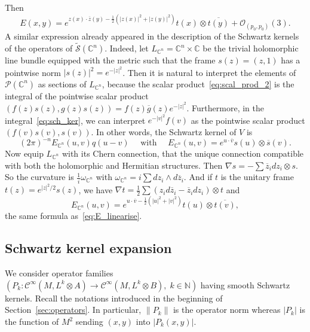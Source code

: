 \documentclass[10pt,a4paper]{article}
\theoremstyle{definition}
\numberwithin{equation}{section}
\newcommand{\N}{{\mathbb{N}}}
\newcommand{\C}{{\mathbb{C}}}
\newcommand{\om}{{\omega}}
\newcommand{\con}{\overline}
\newcommand{\Ci}{{\mathcal{C}}^{\infty}}
\newcommand{\bigo}{\mathcal{O}}
\newcommand{\symb}{\mathcal{S}}
\newcommand{\pol}{\mathcal{P}}
\begin{document}
Then
\begin{equation}\label{eq:E_linearise}
E(x,y) = e^{ z(x) \cdot \con{z} (y) -\frac{1}{2} \left(|z(x)|^2 + |z (y)|^2\right)} t(x) \otimes \con{t(y)} + \bigo_{\left(p_0, p_0\right)} (3).
\end{equation}
A similar expression already appeared in the description of the Schwartz kernels of the operators of $\widetilde{\symb} (\C^n)$. Indeed, let $L_{\C^n}= \C^n \times \C$ be the trivial holomorphic line bundle equipped with the metric such that the frame $s(z) = (z,1)$ has a pointwise norm $|s(z)|^2 = e^{-|z|^2}$. Then it is natural to interpret the elements of $\pol (\C^n)$ as sections of $L_{\C^n}$, because the scalar product~\eqref{eq:scal_prod_2} is the integral of the pointwise scalar product $(f (z) s(z), g(z) s(z)) = f(z) \con{g} (z) e^{-|z|^2}$. Furthermore, in the integral~\eqref{eq:sch_ker}, we can interpret $e^{-|v|^2} f(v)$ as the pointwise scalar product $(f(v) s(v), s(v))$. In other words, the Schwartz kernel of $V$ is
\begin{equation}\label{eq:2pin-e_cn-u}
(2\pi)^{-n} E_{\C^n} (u,v) q(u-v) \quad \text{ with }
\quad E_{\C^n}(u,v) =e^{u \cdot \con{v}} s(u) \otimes \con{s}(v).
\end{equation}
Now equip $L_{\C^n}$ with its Chern connection, that the unique connection compatible with both the holomorphic and Hermitian structures. Then $\nabla s = - \sum \con{z}_i dz_i \otimes s$. So the curvature is $\frac{1}{i} \om_{\C^n} $ with $\om_{\C^n} = i \sum dz_i
\wedge d \con{z}_i$. And if $t $ is the unitary frame $t(z) = e^{|z|^2/2} s (z)$, we have $\nabla t = \frac{1}{2} \sum (z_i d \con{z}_i - \con{z}_i d z_i) \otimes t$ and
\[
E_{\C^n}(u,v) = e^{ u \cdot \con v - \frac{1}{2} \left(
|u|^2+ |v|^2\right)} t(u) \otimes \con{t(v)},
\]
the same formula as~\eqref{eq:E_linearise}.

\subsection{Schwartz kernel expansion} \label{sec:global-expansion}


We consider operator families $(P_k : \Ci(M, L^k \otimes A) \rightarrow \Ci(M, L^k \otimes B), \; k \in \N)$ having smooth Schwartz kernels. Recall the notations introduced in the beginning of Section~\ref{sec:operators}. In particular, $\| P_k \|$ is the operator norm whereas $|P_k|$ is the function of $M^2$ sending $(x,y)$ into $|P_k(x,y)|$.
\end{document}
